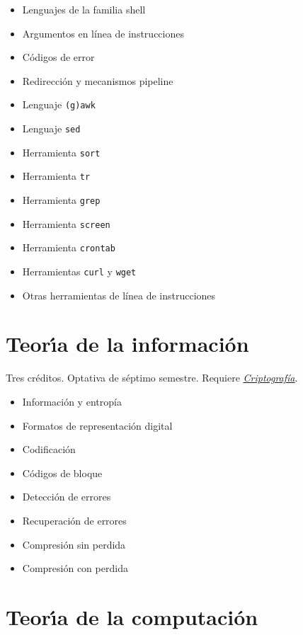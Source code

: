 \documentclass{article}
\begin{document}
\begin{multicols}{4}
\begin{itemize}
\item{Lenguajes de la familia shell}
\item{Argumentos en l\'{i}nea de instrucciones}
\item{C\'{o}digos de error}
\item{Redirecci\'{o}n y mecanismos pipeline}
\item{Lenguaje \texttt{(g)awk}}
\item{Lenguaje \texttt{sed}}
\item{Herramienta \texttt{sort}}  
\item{Herramienta \texttt{tr}}
\item{Herramienta \texttt{grep}}
\item{Herramienta \texttt{screen}}
\item{Herramienta \texttt{crontab}}
\item{Herramientas \texttt{curl} y \texttt{wget}}  
\item{Otras herramientas de l\'{i}nea de instrucciones}
\end{itemize}

\newpage

\hypertarget{tdi}{\section*{Teor\'{\i}a de la informaci\'{o}n}}

Tres cr\'{e}ditos. Optativa de s\'{e}ptimo semestre. Requiere
\hyperlink{cr}{\em Criptograf\'{i}a}.

\begin{itemize}
\item{Informaci\'{o}n y entrop\'{i}a}
\item{Formatos de representaci\'{o}n digital}
\item{Codificaci\'{o}n}
\item{C\'{o}digos de bloque}
\item{Detecci\'{o}n de errores}
\item{Recuperaci\'{o}n de errores}
\item{Compresi\'{o}n sin perdida}
\item{Compresi\'{o}n con perdida}
\end{itemize}

\vfill\null \columnbreak

\hypertarget{tdc}{\section*{Teor\'{\i}a de la computaci\'{o}n}}


\end{multicols}
\end{document}
